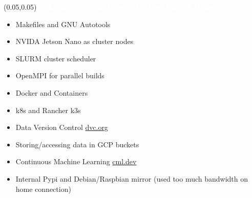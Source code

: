 \documentclass[aspectratio=169]{beamer} %
\begin{document}
\begin{frame}{}
    \setlength{\TPHorizModule}{\textwidth}
    \setlength{\TPVertModule}{\textwidth}
    \begin{textblock}{0.74}(0.05,0.05)
        \bfseries\large\textcolor{white}{Yak Shaving, Side Quests, Endless Rabbit Holes}
    \end{textblock}
    \begin{itemize}
        \item Makefiles and GNU Autotools
        \item NVIDA Jetson Nano as cluster nodes
        \item SLURM cluster scheduler
        \item OpenMPI for parallel builds
        \item Docker and Containers
        \item k8s and Rancher k3s
        \item Data Version Control \href{https://dvc.org}{dvc.org}
        \item Storing/accessing data in GCP buckets
        \item Continuous Machine Learning \href{https://cml.dev/}{cml.dev}
        \item Internal Pypi and Debian/Raspbian mirror (used too much bandwidth on home connection)
    \end{itemize}
\end{frame}
\end{document}
